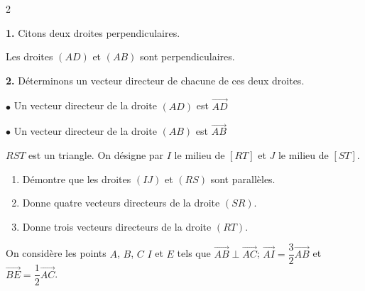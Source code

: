 \begin{multicols*}{2}
\begin{enumerate}
  	\end{enumerate} 
  	\dure
  	\resul
  	\textbf{1.} Citons deux droites perpendiculaires.
  	
  	Les droites $(AD)$ et $(AB)$ sont perpendiculaires.
  	
  	\textbf{2.} Déterminons un vecteur directeur de chacune de ces deux droites.
  	
  	$\bullet$ Un vecteur directeur de la droite $(AD)$ est $\overrightarrow{AD}$
  	
  	$\bullet$ Un vecteur directeur de la droite $(AB)$ est $\overrightarrow{AB}$
  	
  	\begin{center}
  	\end{center}
  	\begin{center}
  	\end{center}
  	$RST$ est un triangle. On désigne par $I$ le milieu de $[RT]$ et $J$ le milieu de $[ST]$.
  	\begin{enumerate}
  		\item  Démontre  que les droites $(IJ)$ et $(RS)$ sont parallèles.
  		\item Donne quatre vecteurs directeurs de la droite $(SR)$.
  		\item Donne trois vecteurs directeurs de la droite $(RT)$.
  	\end{enumerate}
  	\begin{center}
  	\end{center}
  	On considère les points $A$, $B$, $C$ $I$ et $E$ tels que $\overrightarrow{AB} \perp \overrightarrow{AC}$; $\overrightarrow{AI}=\dfrac{3}{2}\overrightarrow{AB}$ et $\overrightarrow{BE}=\dfrac{1}{2}\overrightarrow{AC}$.
  	

\end{multicols*}
